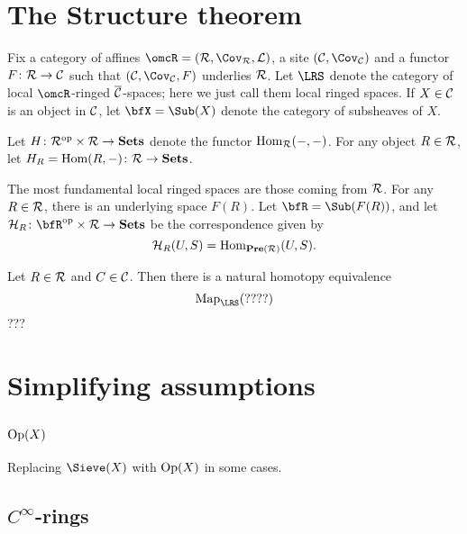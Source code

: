 \documentclass[10pt]{amsart}
\begin{document}
\section{The Structure theorem}

Fix a category of affines $\omcR=(\mcR,\Cov_\mcR,\mcL)$, a site $(\mcC,\Cov_\mcC)$ and a functor $F\colon\mathcal{R}\rightarrow\mathcal{C}$ such that $(\mcC,\Cov_\mcC,F)$ underlies $\mathcal{R}$.  Let $\LRS$ denote the category of local $\omcR$-ringed $\overline{\mathcal{C}}$-spaces; here we just call them local ringed spaces.  If $X\in\mathcal{C}$ is an object in $\mathcal{C}$, let $\bfX=\Sub(X)$ denote the category of subsheaves of $X$.

Let $H\colon \mathcal{R}^\textnormal{op}\times\mathcal{R}\rightarrow{\bf Sets}$ denote the functor $\textnormal{Hom}_\mathcal{R}(-,-)$.  For any object $R\in\mathcal{R}$, let $H_R=\textnormal{Hom}(R,-)\colon\mathcal{R}\rightarrow{\bf Sets}$.

The most fundamental local ringed spaces are those coming from $\mathcal{R}$.  For any $R\in\mathcal{R}$, there is an underlying space $F(R)$.  Let $\bfR=\Sub(F(R))$, and let $\mcH_R\taking\bfR\op\cross\mcR\to\Sets$ be the correspondence given by $$\mathcal{H}_R(U,S)=\textnormal{Hom}_{{\bf Pre}(\mathcal{R})}(U,S).$$




\begin{theorem}

Let $R\in\mathcal{R}$ and $C\in\mathcal{C}$.  Then there is a natural homotopy equivalence $$\Map_{\LRS}(????)$$ ???

\end{theorem}


\section{Simplifying assumptions}\label{sec:simplifying}

\subsection{$\textnormal{Op}(X)$}

Replacing $\Sieve(X)$ with $\textnormal{Op}(X)$ in some cases.

\subsection{$C^\infty$-rings}
\end{document}
